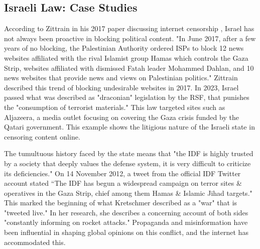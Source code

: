 \subsection{Israeli Law: Case Studies}
According to Zittrain in his 2017 paper discussing internet censorship \cite{zittrain2017shifting}, Israel has not always been proactive in blocking political content. "In June 2017, after a few years of no blocking, the Palestinian Authority ordered ISPs to block 12 news websites affiliated with the rival Islamist group Hamas which controls the Gaza Strip, websites affiliated with dismissed Fatah leader Mohammed Dahlan, and 10 news websites that provide news and views on Palestinian politics." \cite{zittrain2017shifting} Zittrain described this trend of blocking undesirable websites in 2017. In 2023, Israel passed what was described as "draconian" legislation by the RSF, that punishes the "consumption of terrorist materials." \cite{RSF2024IsraelCensorship} This law targeted sites such as Aljazeera, a media outlet focusing on covering the Gaza crisis funded by the Qatari government. \cite{AlJazeera2023Knesset} This example shows the litigious nature of the Israeli state in censoring content online. 

The tumultuous history faced by the state means that "the IDF is highly trusted by a society that deeply values the defense system, it is very difficult to criticize its deficiencies." \cite{MAGEN2018287} On 14 November 2012, a tweet from the official IDF Twitter account stated “The IDF has begun a widespread campaign on terror sites \& operatives in the Gaza Strip, chief among them Hamas \& Islamic Jihad targets." \cite{IDF_Twitter} This marked the beginning of what Kretschmer described as a "war" that is "tweeted live." In her research, she describes a concerning account of both sides "constantly informing on rocket attacks." \cite {Kretschmer_2017} Propaganda and misinformation have been influential in shaping global opinions on this conflict, and the internet has accommodated this.

